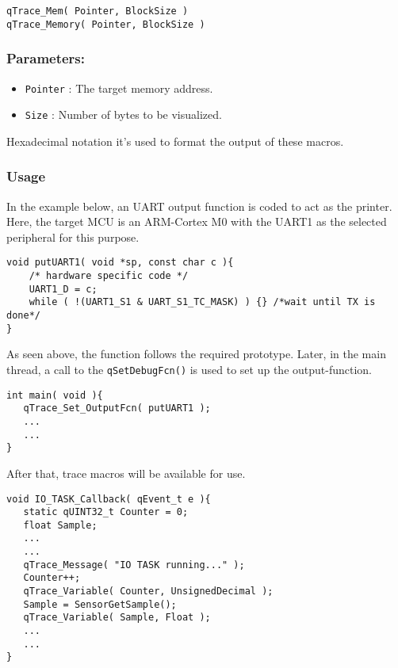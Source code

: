 \begin{lstlisting}[style=CStyle]
qTrace_Mem( Pointer, BlockSize )
qTrace_Memory( Pointer, BlockSize )
\end{lstlisting}

\subsubsection*{Parameters:}
\begin{itemize}
    \item \lstinline{Pointer} : The target memory address.
    \item \lstinline{Size} : Number of bytes to be visualized.
\end{itemize}

Hexadecimal notation it's used to format the output of these macros.

\subsubsection{Usage}

In the example below, an UART output function is coded to act as the printer. Here, the target MCU is an ARM-Cortex M0 with the UART1 as the selected peripheral for this purpose.
\medskip

\begin{lstlisting}[style=CStyle]
void putUART1( void *sp, const char c ){
    /* hardware specific code */
    UART1_D = c;
    while ( !(UART1_S1 & UART_S1_TC_MASK) ) {} /*wait until TX is done*/ 
}
\end{lstlisting}  

As seen above, the function follows the required prototype. Later, in the main thread, a call to the \lstinline{qSetDebugFcn()} is used to set up the output-function.

\begin{lstlisting}[style=CStyle]
int main( void ){
   qTrace_Set_OutputFcn( putUART1 );
   ... 
   ...
}
\end{lstlisting}  

After that, trace macros will be available for use.

\begin{lstlisting}[style=CStyle]
void IO_TASK_Callback( qEvent_t e ){
   static qUINT32_t Counter = 0;
   float Sample;
   ...
   ... 
   qTrace_Message( "IO TASK running..." );
   Counter++;
   qTrace_Variable( Counter, UnsignedDecimal );
   Sample = SensorGetSample();
   qTrace_Variable( Sample, Float );
   ...
   ...
}
\end{lstlisting}

\newpage
